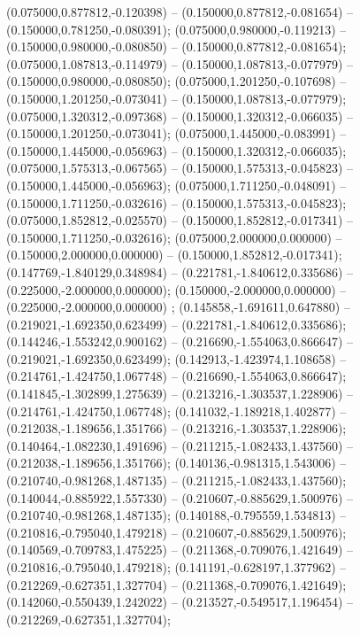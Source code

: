  (0.075000,0.877812,-0.120398) -- (0.150000,0.877812,-0.081654) -- (0.150000,0.781250,-0.080391);
 (0.075000,0.980000,-0.119213) -- (0.150000,0.980000,-0.080850) -- (0.150000,0.877812,-0.081654);
 (0.075000,1.087813,-0.114979) -- (0.150000,1.087813,-0.077979) -- (0.150000,0.980000,-0.080850);
 (0.075000,1.201250,-0.107698) -- (0.150000,1.201250,-0.073041) -- (0.150000,1.087813,-0.077979);
 (0.075000,1.320312,-0.097368) -- (0.150000,1.320312,-0.066035) -- (0.150000,1.201250,-0.073041);
 (0.075000,1.445000,-0.083991) -- (0.150000,1.445000,-0.056963) -- (0.150000,1.320312,-0.066035);
 (0.075000,1.575313,-0.067565) -- (0.150000,1.575313,-0.045823) -- (0.150000,1.445000,-0.056963);
 (0.075000,1.711250,-0.048091) -- (0.150000,1.711250,-0.032616) -- (0.150000,1.575313,-0.045823);
 (0.075000,1.852812,-0.025570) -- (0.150000,1.852812,-0.017341) -- (0.150000,1.711250,-0.032616);
 (0.075000,2.000000,0.000000) -- (0.150000,2.000000,0.000000) -- (0.150000,1.852812,-0.017341);
 (0.147769,-1.840129,0.348984) -- (0.221781,-1.840612,0.335686) -- (0.225000,-2.000000,0.000000);
 (0.150000,-2.000000,0.000000) -- (0.225000,-2.000000,0.000000) ;
 (0.145858,-1.691611,0.647880) -- (0.219021,-1.692350,0.623499) -- (0.221781,-1.840612,0.335686);
 (0.144246,-1.553242,0.900162) -- (0.216690,-1.554063,0.866647) -- (0.219021,-1.692350,0.623499);
 (0.142913,-1.423974,1.108658) -- (0.214761,-1.424750,1.067748) -- (0.216690,-1.554063,0.866647);
 (0.141845,-1.302899,1.275639) -- (0.213216,-1.303537,1.228906) -- (0.214761,-1.424750,1.067748);
 (0.141032,-1.189218,1.402877) -- (0.212038,-1.189656,1.351766) -- (0.213216,-1.303537,1.228906);
 (0.140464,-1.082230,1.491696) -- (0.211215,-1.082433,1.437560) -- (0.212038,-1.189656,1.351766);
 (0.140136,-0.981315,1.543006) -- (0.210740,-0.981268,1.487135) -- (0.211215,-1.082433,1.437560);
 (0.140044,-0.885922,1.557330) -- (0.210607,-0.885629,1.500976) -- (0.210740,-0.981268,1.487135);
 (0.140188,-0.795559,1.534813) -- (0.210816,-0.795040,1.479218) -- (0.210607,-0.885629,1.500976);
 (0.140569,-0.709783,1.475225) -- (0.211368,-0.709076,1.421649) -- (0.210816,-0.795040,1.479218);
 (0.141191,-0.628197,1.377962) -- (0.212269,-0.627351,1.327704) -- (0.211368,-0.709076,1.421649);
 (0.142060,-0.550439,1.242022) -- (0.213527,-0.549517,1.196454) -- (0.212269,-0.627351,1.327704);
